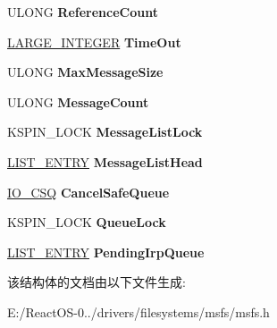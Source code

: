 \begin{DoxyCompactItemize}
U\+L\+O\+NG {\bfseries Reference\+Count}
\item 
\mbox{\label{struct___m_s_f_s___f_c_b_a7b55ad9f96809999c45b5adf9100ad28}} 
\hyperlink{union___l_a_r_g_e___i_n_t_e_g_e_r}{L\+A\+R\+G\+E\+\_\+\+I\+N\+T\+E\+G\+ER} {\bfseries Time\+Out}
\item 
\mbox{\label{struct___m_s_f_s___f_c_b_a9d3a5e2fa7376fb271fc209cd84142f4}} 
U\+L\+O\+NG {\bfseries Max\+Message\+Size}
\item 
\mbox{\label{struct___m_s_f_s___f_c_b_a2ebdf5058d91555c8cd6a212d7c42a70}} 
U\+L\+O\+NG {\bfseries Message\+Count}
\item 
\mbox{\label{struct___m_s_f_s___f_c_b_aa1a1b8867f13b737cfcf7d0e66099926}} 
K\+S\+P\+I\+N\+\_\+\+L\+O\+CK {\bfseries Message\+List\+Lock}
\item 
\mbox{\label{struct___m_s_f_s___f_c_b_a403ab709a8e91ded8f7151bae1ef3561}} 
\hyperlink{struct___l_i_s_t___e_n_t_r_y}{L\+I\+S\+T\+\_\+\+E\+N\+T\+RY} {\bfseries Message\+List\+Head}
\item 
\mbox{\label{struct___m_s_f_s___f_c_b_acadc35e758f1a4070b74c7e733de2039}} 
\hyperlink{struct___i_o___c_s_q}{I\+O\+\_\+\+C\+SQ} {\bfseries Cancel\+Safe\+Queue}
\item 
\mbox{\label{struct___m_s_f_s___f_c_b_a2ebbbc6472b1af69f08e7525898c1c95}} 
K\+S\+P\+I\+N\+\_\+\+L\+O\+CK {\bfseries Queue\+Lock}
\item 
\mbox{\label{struct___m_s_f_s___f_c_b_ae3a7f32e1ebf18a0c85780295e39d6c5}} 
\hyperlink{struct___l_i_s_t___e_n_t_r_y}{L\+I\+S\+T\+\_\+\+E\+N\+T\+RY} {\bfseries Pending\+Irp\+Queue}
\end{DoxyCompactItemize}


该结构体的文档由以下文件生成\+:\begin{DoxyCompactItemize}
\item 
E\+:/\+React\+O\+S-\/0../drivers/filesystems/msfs/msfs.\+h\end{DoxyCompactItemize}
